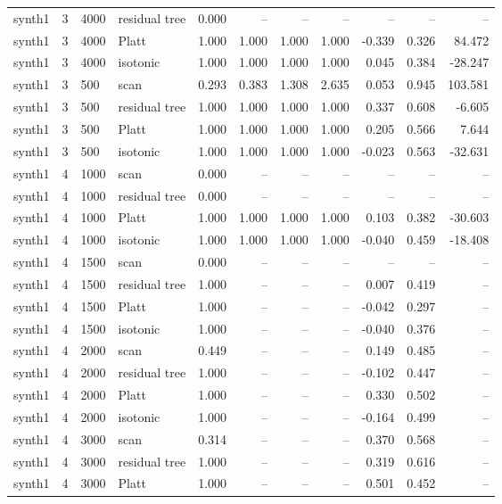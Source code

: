 \begin{tabular}{lrllrrrrrrr}
synth1 & 3 & 4000 & residual tree & 0.000 & -- & -- & -- & -- & -- & -- \\
synth1 & 3 & 4000 & Platt & 1.000 & 1.000 & 1.000 & 1.000 & -0.339 & 0.326 & 84.472 \\
synth1 & 3 & 4000 & isotonic & 1.000 & 1.000 & 1.000 & 1.000 & 0.045 & 0.384 & -28.247 \\
synth1 & 3 & 500 & scan & 0.293 & 0.383 & 1.308 & 2.635 & 0.053 & 0.945 & 103.581 \\
synth1 & 3 & 500 & residual tree & 1.000 & 1.000 & 1.000 & 1.000 & 0.337 & 0.608 & -6.605 \\
synth1 & 3 & 500 & Platt & 1.000 & 1.000 & 1.000 & 1.000 & 0.205 & 0.566 & 7.644 \\
synth1 & 3 & 500 & isotonic & 1.000 & 1.000 & 1.000 & 1.000 & -0.023 & 0.563 & -32.631 \\
synth1 & 4 & 1000 & scan & 0.000 & -- & -- & -- & -- & -- & -- \\
synth1 & 4 & 1000 & residual tree & 0.000 & -- & -- & -- & -- & -- & -- \\
synth1 & 4 & 1000 & Platt & 1.000 & 1.000 & 1.000 & 1.000 & 0.103 & 0.382 & -30.603 \\
synth1 & 4 & 1000 & isotonic & 1.000 & 1.000 & 1.000 & 1.000 & -0.040 & 0.459 & -18.408 \\
synth1 & 4 & 1500 & scan & 0.000 & -- & -- & -- & -- & -- & -- \\
synth1 & 4 & 1500 & residual tree & 1.000 & -- & -- & -- & 0.007 & 0.419 & -- \\
synth1 & 4 & 1500 & Platt & 1.000 & -- & -- & -- & -0.042 & 0.297 & -- \\
synth1 & 4 & 1500 & isotonic & 1.000 & -- & -- & -- & -0.040 & 0.376 & -- \\
synth1 & 4 & 2000 & scan & 0.449 & -- & -- & -- & 0.149 & 0.485 & -- \\
synth1 & 4 & 2000 & residual tree & 1.000 & -- & -- & -- & -0.102 & 0.447 & -- \\
synth1 & 4 & 2000 & Platt & 1.000 & -- & -- & -- & 0.330 & 0.502 & -- \\
synth1 & 4 & 2000 & isotonic & 1.000 & -- & -- & -- & -0.164 & 0.499 & -- \\
synth1 & 4 & 3000 & scan & 0.314 & -- & -- & -- & 0.370 & 0.568 & -- \\
synth1 & 4 & 3000 & residual tree & 1.000 & -- & -- & -- & 0.319 & 0.616 & -- \\
synth1 & 4 & 3000 & Platt & 1.000 & -- & -- & -- & 0.501 & 0.452 & -- \\

\end{tabular}
